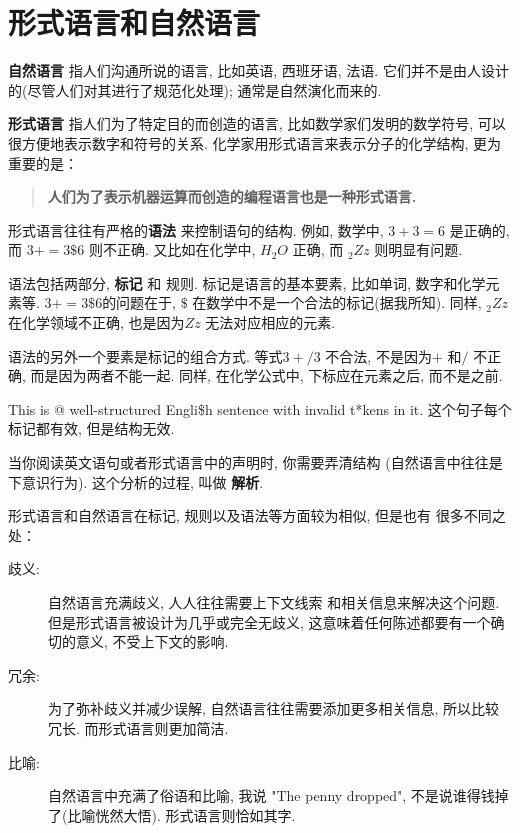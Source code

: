 \documentclass[10pt]{book}
\begin{document}



\section{形式语言和自然语言}

{\bf 自然语言} 指人们沟通所说的语言, 比如英语, 西班牙语, 法语. 
它们并不是由人设计的(尽管人们对其进行了规范化处理); 通常是自然演化而来的. 


{\bf 形式语言} 指人们为了特定目的而创造的语言, 
比如数学家们发明的数学符号, 
可以很方便地表示数字和符号的关系. 
化学家用形式语言来表示分子的化学结构, 更为重要的是：

\begin{quote}
{\bf 人们为了表示机器运算而创造的编程语言也是一种形式语言. }
\end{quote}

形式语言往往有严格的{\bf 语法} 来控制语句的结构. 例如, 
数学中, $3 + 3 = 6$ 是正确的, 而 $3 + = 3 \$ 6$ 则不正确. 
又比如在化学中, $H_2O$ 正确, 而 $_2Zz$ 则明显有问题. 

语法包括两部分, {\bf 标记} 和 规则. 
标记是语言的基本要素, 比如单词, 数字和化学元素等. 
$3 += 3 \$ 6$的问题在于, \(\$\) 在数学中不是一个合法的标记(据我所知). 
同样, $_2Zz$ 在化学领域不正确, 也是因为$Zz$ 无法对应相应的元素. 

语法的另外一个要素是标记的组合方式. 
等式$3 +/ 3$ 不合法, 不是因为$+$ 和$/$ 不正确, 而是因为两者不能一起. 
同样, 在化学公式中, 下标应在元素之后, 而不是之前. 

This is @ well-structured Engli\$h
sentence with invalid t*kens in it. 这个句子每个标记都有效, 
但是结构无效. 

当你阅读英文语句或者形式语言中的声明时, 
你需要弄清结构
(自然语言中往往是下意识行为). 这个分析的过程, 叫做 {\bf 解析}. 

形式语言和自然语言在标记, 规则以及语法等方面较为相似, 但是也有
很多不同之处：

\begin{description}

\item[歧义:] 自然语言充满歧义, 人人往往需要上下文线索
和相关信息来解决这个问题. 但是形式语言被设计为几乎或完全无歧义, 
这意味着任何陈述都要有一个确切的意义, 不受上下文的影响. 

\item[冗余:] 为了弥补歧义并减少误解, 
自然语言往往需要添加更多相关信息, 所以比较冗长. 
而形式语言则更加简洁. 

\item[比喻:] 自然语言中充满了俗语和比喻, 我说 "The penny dropped", 
不是说谁得钱掉了(比喻恍然大悟). 形式语言则恰如其字. 

\end{description}
\end{document}

